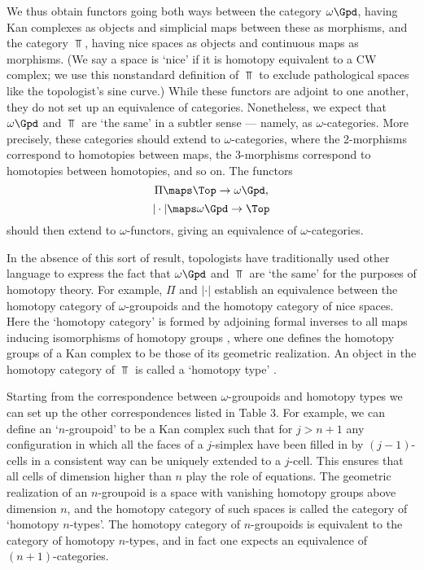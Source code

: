 We thus obtain functors going both ways between the category
$\omega\Gpd$, having Kan complexes as objects and simplicial maps
between these as morphisms, and the category $\Top$, having nice
spaces as objects and continuous maps as morphisms.  (We say a space
is `nice' if it is homotopy equivalent to a CW complex; we use this
nonstandard definition of $\Top$ to exclude pathological spaces like the
topologist's sine curve.)  While these functors are adjoint to one
another, they do not set up an equivalence of categories.  Nonetheless,
we expect that $\omega\Gpd$ and $\Top$ are `the same' in a subtler sense
--- namely, as $\omega$-categories.  More precisely, these categories
should extend to $\omega$-categories, where the 2-morphisms correspond
to homotopies between maps, the 3-morphisms correspond to homotopies
between homotopies, and so on.  The functors
\[ \Pi \maps \Top \to \omega\Gpd, \] 
\[ |\cdot| \maps \omega\Gpd \to \Top\] 
should then extend to $\omega$-functors, giving an equivalence of
$\omega$-categories.

In the absence of this sort of result, topologists have traditionally
used other language to express the fact that $\omega\Gpd$ and $\Top$ are
`the same' for the purposes of homotopy theory.  For example, $\Pi$ and
$|\cdot|$ establish an equivalence between the homotopy category of
$\omega$-groupoids and the homotopy category of nice spaces.  Here the
`homotopy category' is formed by adjoining formal inverses to all maps
inducing isomorphisms of homotopy groups \cite{GZ}, where one defines
the homotopy groups of a Kan complex to be those of its geometric
realization.  An object in the homotopy category of $\Top$ is called a
`homotopy type' \cite{Baues}.

Starting from the correspondence between $\omega$-groupoids and homotopy
types we can set up the other correspondences listed in Table 3.  For
example, we can define an `$n$-groupoid' to be a Kan complex such that
for $j > n + 1$ any configuration in which all the faces of a
$j$-simplex have been filled in by $(j-1)$-cells in a consistent way can
be uniquely extended to a $j$-cell.  This ensures that all cells of
dimension higher than $n$ play the role of equations.   The geometric
realization of an $n$-groupoid is a space with vanishing homotopy groups
above dimension $n$, and the homotopy category of such spaces is called
the category of `homotopy $n$-types'.   The homotopy category of
$n$-groupoids is equivalent to the category of homotopy $n$-types, and
in fact one expects an equivalence of $(n+1)$-categories. 

